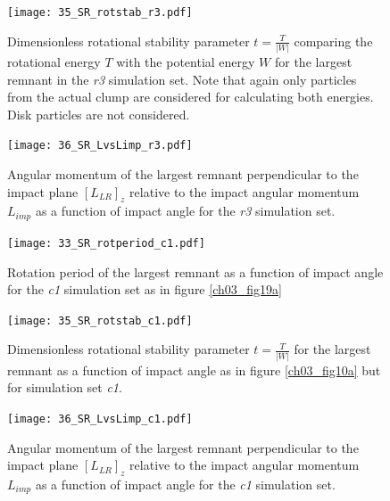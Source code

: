 {\begin{landscape}
\begin{figure}
\begin{center}
\texttt{[image: 35\_SR\_rotstab\_r3.pdf]}
\caption{Dimensionless rotational stability parameter $t = \frac{T}{|W|}$ comparing the rotational energy $T$ with the potential energy $W$ for the largest remnant in the \emph{r3} simulation set. Note that again only particles from the actual clump are considered for calculating both energies. Disk particles are not considered.}
\label{ch03_fig35a}
\end{center}
\end{figure}

\begin{figure}
\begin{center}
\texttt{[image: 36\_SR\_LvsLimp\_r3.pdf]}
\caption{Angular momentum of the largest remnant perpendicular to the impact plane $[L_{LR}]_z$ relative to the impact angular momentum $L_{imp}$ as a function of impact angle for the \emph{r3} simulation set.}
\label{ch03_fig36a}
\end{center}
\end{figure}

\begin{figure}
\begin{center}
\texttt{[image: 33\_SR\_rotperiod\_c1.pdf]}
\caption{Rotation period of the largest remnant as a function of impact angle for the \emph{c1} simulation set as in figure \ref{ch03_fig19a} }
\label{ch03_fig33b}
\end{center}
\end{figure}

\begin{figure}
\begin{center}
\texttt{[image: 35\_SR\_rotstab\_c1.pdf]}
\caption{Dimensionless rotational stability parameter $t = \frac{T}{|W|}$ for the largest remnant as a function of impact angle as in figure \ref{ch03_fig10a} but for simulation set \emph{c1}.}
\label{ch03_fig35b} 
\end{center}
\end{figure}

\begin{figure}
\begin{center}
\texttt{[image: 36\_SR\_LvsLimp\_c1.pdf]}
\caption{Angular momentum of the largest remnant perpendicular to the impact plane $[L_{LR}]_z$ relative to the impact angular momentum $L_{imp}$ as a function of impact angle for the \emph{c1} simulation set.}
\label{ch03_fig36b}
\end{center}
\end{figure}


\end{landscape}}
